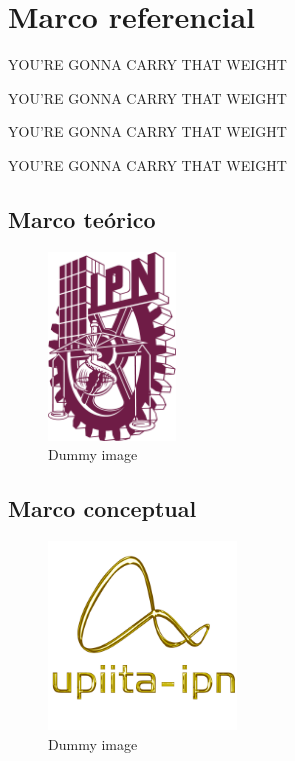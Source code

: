 
\chapter{Marco referencial}

\lipsum[23-25]

\vfill

\begin{flushright}
	{\LARGE YOU'RE GONNA CARRY THAT WEIGHT}
\end{flushright}

\begin{flushright}
	{\myfont YOU'RE GONNA CARRY THAT WEIGHT}
\end{flushright}

\begin{flushright}
	{\Huge\myfont YOU'RE GONNA CARRY THAT WEIGHT}
\end{flushright}

\begin{flushright}
	{\Huge\myCBfont YOU'RE GONNA CARRY THAT WEIGHT}
\end{flushright}

\section{Marco teórico}

\lipsum[26-27]

\begin{figure}[!ht]
	\centering
	\includegraphics[height=50mm]{images/LOGO POLI PANTONE 222 C.png}
	\caption{Dummy image}
\end{figure}

\section{Marco conceptual}

\lipsum[28-29]

\begin{figure}[!ht]
	\centering
	\includegraphics[height=50mm]{images/logo_upiita_oro.png}
	\caption{Dummy image}
\end{figure}

\newpage

